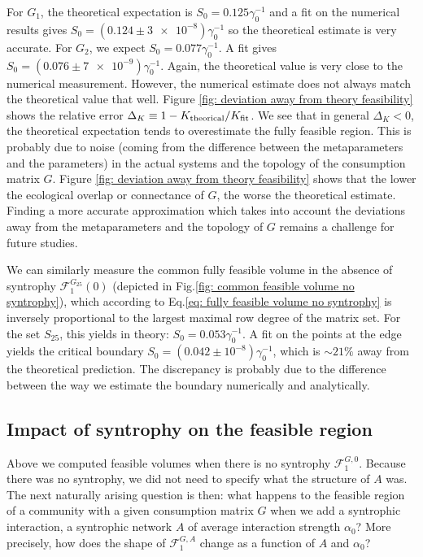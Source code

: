 \documentclass[12pt, titlepage]{report}
\begin{document}
 For $G_1$, the theoretical expectation is $S_0 = 0.125 \gamma_0^{-1}$ and a fit on the numerical results gives $S_0=(\num[scientific-notation=false]{0.124}\pm\num{3e-8}) \gamma_0^{-1}$ so the theoretical estimate is very accurate.
For $G_2$, we expect $S_0 = 0.077 \gamma_0^{-1}$. A fit gives $S_0=(\num[scientific-notation=false]{0.076}\pm\num{7e-9})\gamma_0^{-1}$. Again, the theoretical value is very close to the numerical measurement.
However, the numerical estimate does not always match the theoretical value that well. Figure \ref{fig: deviation away from theory feasibility} shows the relative error $\Delta_K \equiv 1 - K_\text{theorical}/K_\text{fit}$. We see that in general $\Delta_K < 0$, \ie the theoretical expectation tends to overestimate the fully feasible region. This is probably due to noise (\ie coming from the difference between the metaparameters and the parameters) in the actual systems and the topology of the consumption matrix $G$. Figure \ref{fig: deviation away from theory feasibility} shows that the lower the ecological overlap or connectance of $G$, the worse the theoretical estimate. Finding a more accurate approximation which takes into account the deviations away from the metaparameters and the topology of $G$ remains a challenge for future studies.


We can similarly measure the common fully feasible volume in the absence of syntrophy $\mathcal{F}_1^{G_{25}}(0)$ (depicted in Fig.\ref{fig: common feasible volume no syntrophy}), which according to Eq.\eqref{eq: fully feasible volume no syntrophy} is inversely proportional to the largest maximal row degree of the matrix set. For the set $S_{25}$, this yields in theory: $S_0 = 0.053 \gamma_0^{-1}$. A fit on the points at the edge yields the critical boundary $S_0 = (0.042 \pm 10^{-8})\gamma_0^{-1}$, which is $\sim 21 \%$ away from the theoretical prediction. The discrepancy is probably due to the difference between the way we estimate the boundary numerically
and analytically.

\subsection{Impact of syntrophy on the feasible region}

Above we computed feasible volumes when there is no syntrophy \ie $\mathcal{F}^{G,0}_1$. Because there was no syntrophy, we did not need to specify what the structure of $A$ was. The next naturally arising question is then: what happens to the feasible region of a community with a given consumption matrix $G$ when we add a syntrophic interaction, \ie a syntrophic network $A$ of average interaction strength $\alpha_0$? More precisely, how does the shape of $\mathcal{F}^{G,A}_1$ change as a function of $A$ and $\alpha_0$?
\end{document}
